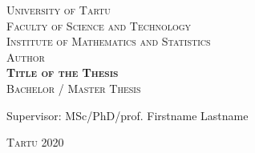 \begin{titlepage}
\begin{center}

\textsc{University of Tartu}\\
\textsc{Faculty of Science and Technology}\\
\textsc{Institute of Mathematics and Statistics}\\[4.5cm]

{\large\textsc{Author}}\\[0.2cm]
{\Large\textsc{\bfseries Title of the Thesis}}\\[0.2cm]
\textsc{Bachelor / Master Thesis}\\[3.2cm]

{\hfill \sffamily Supervisor: MSc/PhD/prof. Firstname Lastname}


\textsc{Tartu 2020}
\end{center}
\end{titlepage}